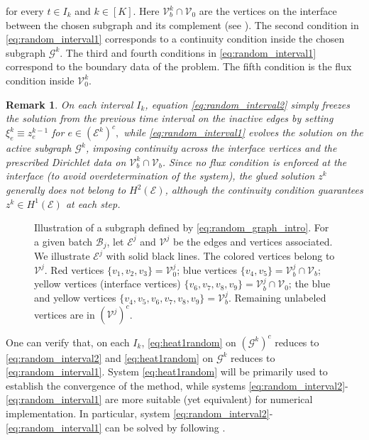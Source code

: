 \documentclass[10pt,a4paper]{amsart}
\newtheorem{remark}{Remark}[section]
\begin{document}
for every $t\in I_k$ and $k \in [K]$. Here $\mathcal{V}^k_b \cap \mathcal{V}_0$ are the vertices on the interface between the chosen subgraph and its complement (see ). The second condition in \eqref{eq:random_interval1} corresponds to a continuity condition inside the chosen subgraph $\mathcal{G}^k$. The third and fourth conditions in \eqref{eq:random_interval1} correspond to the boundary data of the problem. The fifth condition is the flux condition inside $\mathcal{V}_0^k$. 

\begin{remark}\label{remark_system_discrete} On each interval $I_k$, equation \eqref{eq:random_interval2} simply freezes the solution from the previous time interval on the inactive edges by setting $  \xi^k_e \equiv z^{k-1}_e$ for $e\in(\mathcal{E}^k)^c,$ while \eqref{eq:random_interval1} evolves the solution on the active subgraph $\mathcal{G}^k$, imposing continuity across the interface vertices and the prescribed Dirichlet data on $\mathcal{V}_b^k\cap\mathcal{V}_b$. Since no flux condition is enforced at the interface (to avoid overdetermination of the system), the glued solution $z^k$ generally does not belong to $H^2(\mathcal E)$, although the continuity condition guarantees $z^k\in H^1(\mathcal E)$ at each step.
\end{remark}


    
    

\begin{figure}[h]
      \centering
      
      \caption{Illustration of a subgraph defined by \eqref{eq:random_graph_intro}. For a given batch $\mathcal{B}_j$, let $\mathcal{E}^j$ and $\mathcal{V}^j$ be the edges and vertices associated. We illustrate $\mathcal{E}^j$ with solid black lines. The colored vertices belong to $\mathcal{V}^j$. Red vertices $\{v_1,v_2,v_3\}=\mathcal{V}_0^j$; blue vertices $\{v_4,v_5\}=\mathcal{V}_b^j \cap \mathcal{V}_b$; yellow vertices (interface vertices) $\{v_6,v_7,v_8,v_9\}=\mathcal{V}_b^j \cap \mathcal{V}_0$; the blue and yellow vertices $\{v_4,v_5,v_6,v_7,v_8,v_9\}=\mathcal{V}_b^j$. Remaining unlabeled vertices are in $(\mathcal{V}^j)^c$.}
      \label{fig:differnt_nodes}
    \end{figure}




 One can verify that, on each $I_k$,  \eqref{eq:heat1random} on $(\mathcal{G}^k)^c$ reduces to \eqref{eq:random_interval2} and \eqref{eq:heat1random} on $\mathcal{G}^k$ reduces to \eqref{eq:random_interval1}. System \eqref{eq:heat1random} will be primarily used to establish the convergence of the method, while systems \eqref{eq:random_interval2}-\eqref{eq:random_interval1} are more suitable (yet equivalent) for numerical implementation. In particular, system \eqref{eq:random_interval2}-\eqref{eq:random_interval1} can be solved by following .
 
\end{document}
